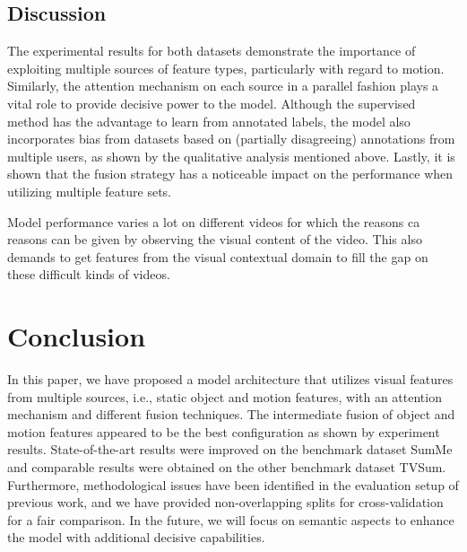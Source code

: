 \documentclass{article}
\begin{document}
\subsection{Discussion}
The experimental results for both datasets demonstrate the importance of exploiting multiple sources of feature types, particularly with regard to motion. Similarly, the attention mechanism on each source in a parallel fashion plays a vital role to provide decisive power to the model. Although the supervised method has the advantage to learn from annotated labels, the model also incorporates bias from datasets based on (partially disagreeing) annotations from multiple users, as shown by the qualitative analysis mentioned above. Lastly, it is shown that the fusion strategy has a noticeable impact on the performance when utilizing multiple feature sets. 
																																																																																																																																																																					
 Model performance varies a lot on different videos for which the reasons ca reasons can be given by observing the visual content of the video. This also demands to get features from the visual contextual domain to fill the gap on these difficult kinds of videos.

\section{Conclusion}\label{sec:conclusion}

In this paper, we have proposed a model architecture that utilizes visual features from multiple sources, i.e., static object and motion features, with an attention mechanism and different fusion techniques. The intermediate fusion of object and motion features appeared to be the best configuration as shown by experiment results. State-of-the-art results were improved on the benchmark dataset SumMe and comparable results were obtained on the other benchmark dataset TVSum. Furthermore, methodological issues have been identified in the evaluation setup of previous work, and we have provided non-overlapping splits for cross-validation for a fair comparison. In the future, we will focus on semantic aspects to enhance the model with additional decisive capabilities.  




\end{document}
